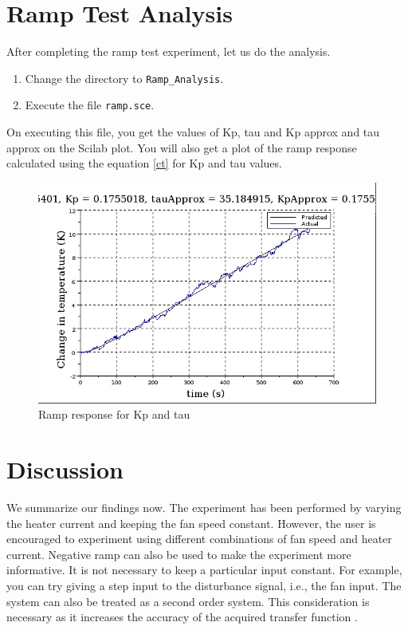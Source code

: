 \section{Ramp Test Analysis}
After completing the ramp test experiment, let us do the analysis. 
\begin{enumerate}
 \item Change the directory to {\tt Ramp\_Analysis}.
 \item Execute the file {\tt ramp.sce}. 
\end{enumerate}
On executing this file, you get the values of Kp, tau and Kp approx and tau approx on the Scilab plot. 
You will also get a plot of the ramp response calculated using the equation \ref{ct} for Kp and tau values.
\begin{figure}[h]
	\centering
		\includegraphics[width=\linewidth]{Ramp-test_manual/ramp_analysis.jpg}
	\caption{Ramp response for Kp and tau}
	\label{fig:fit_curve_ramp}
\end{figure}

\section{Discussion}
We summarize our findings now. The experiment has been performed by varying the heater current and keeping the fan 
speed constant. However, the user is encouraged to experiment using different combinations of fan speed 
and heater current. Negative ramp can also be used to make the experiment more informative. 
It is not necessary to keep a particular input constant. For example, you can try giving a step input to the 
disturbance signal, i.e., the fan input. The system can also be treated as a second order system. This consideration 
is necessary as it increases the accuracy of the acquired transfer function \cite{kmm09}.
